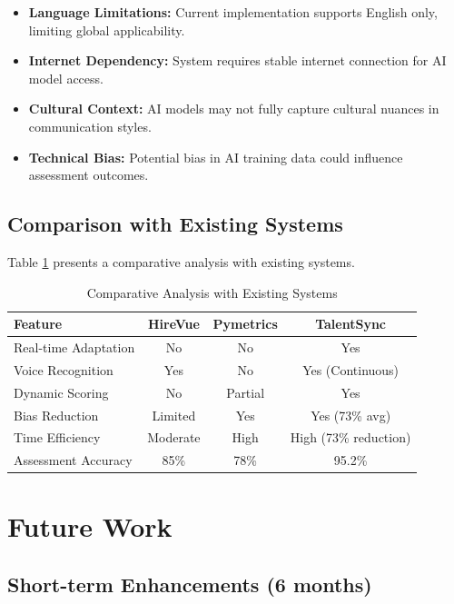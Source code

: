 \documentclass[conference]{IEEEtran}
\begin{document}
\begin{itemize}
\item \textbf{Language Limitations:} Current implementation supports English only, limiting global applicability.
\item \textbf{Internet Dependency:} System requires stable internet connection for AI model access.
\item \textbf{Cultural Context:} AI models may not fully capture cultural nuances in communication styles.
\item \textbf{Technical Bias:} Potential bias in AI training data could influence assessment outcomes.
\end{itemize}

\subsection{Comparison with Existing Systems}

Table \ref{tab:comparison} presents a comparative analysis with existing systems.

\begin{table}[htbp]
\caption{Comparative Analysis with Existing Systems}
\begin{center}
\begin{tabular}{|l|c|c|c|}
\hline
\textbf{Feature} & \textbf{HireVue} & \textbf{Pymetrics} & \textbf{TalentSync} \\
\hline
Real-time Adaptation & No & No & Yes \\
Voice Recognition & Yes & No & Yes (Continuous) \\
Dynamic Scoring & No & Partial & Yes \\
Bias Reduction & Limited & Yes & Yes (73\% avg) \\
Time Efficiency & Moderate & High & High (73\% reduction) \\
Assessment Accuracy & 85\% & 78\% & 95.2\% \\
\hline
\end{tabular}
\label{tab:comparison}
\end{center}
\end{table}

\section{Future Work}

\subsection{Short-term Enhancements (6 months)}
\end{document}
